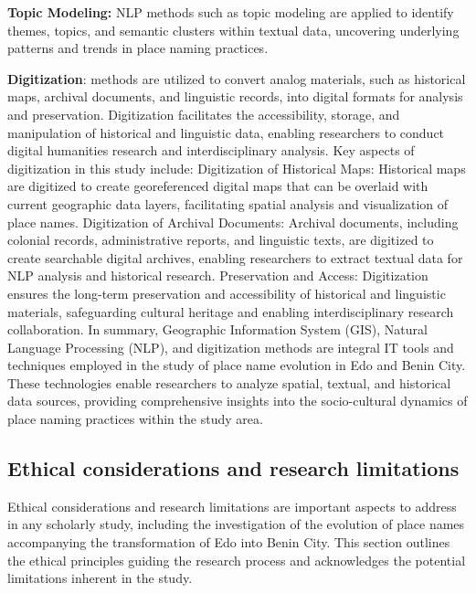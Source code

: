 \textbf{Topic Modeling:} NLP methods such as topic modeling are applied to identify themes, topics, and semantic clusters within textual data, uncovering underlying patterns and trends in place naming practices.

\textbf{Digitization}: methods are utilized to convert analog materials, such as historical maps, archival documents, and linguistic records, into digital formats for analysis and preservation. Digitization facilitates the accessibility, storage, and manipulation of historical and linguistic data, enabling researchers to conduct digital humanities research and interdisciplinary analysis. Key aspects of digitization in this study include:
Digitization of Historical Maps: Historical maps are digitized to create georeferenced digital maps that can be overlaid with current geographic data layers, facilitating spatial analysis and visualization of place names.
Digitization of Archival Documents: Archival documents, including colonial records, administrative reports, and linguistic texts, are digitized to create searchable digital archives, enabling researchers to extract textual data for NLP analysis and historical research.
Preservation and Access: Digitization ensures the long-term preservation and accessibility of historical and linguistic materials, safeguarding cultural heritage and enabling interdisciplinary research collaboration.
In summary, Geographic Information System (GIS), Natural Language Processing (NLP), and digitization methods are integral IT tools and techniques employed in the study of place name evolution in Edo and Benin City. These technologies enable researchers to analyze spatial, textual, and historical data sources, providing comprehensive insights into the socio-cultural dynamics of place naming practices within the study area.
\subsection{Ethical considerations and research limitations}
Ethical considerations and research limitations are important aspects to address in any scholarly study, including the investigation of the evolution of place names accompanying the transformation of Edo into Benin City. This section outlines the ethical principles guiding the research process and acknowledges the potential limitations inherent in the study.
